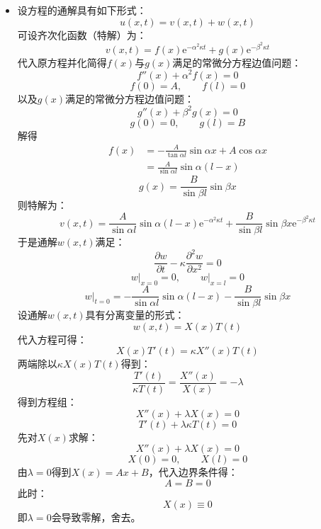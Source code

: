 \documentclass[fontset=windows]{ctexart}
\begin{document}
\begin{itemize}
    \item[10.]
    设方程的通解具有如下形式：
    \[
    u(x,t) = v(x,t) + w(x,t)
    \]
    可设齐次化函数（特解）为：
    \[
    v(x,t) = f(x)\mathrm{e}^{-\alpha^2\kappa t} + g(x)\mathrm{e}^{-\beta^2\kappa t}
    \]
    代入原方程并化简得$f(x)$与$g(x)$满足的常微分方程边值问题：
    \[
    f''(x) + \alpha^2f(x) = 0
    \]
    \[
    f(0) = A,\qquad
    f(l) = 0
    \]
    以及$g(x)$满足的常微分方程边值问题：
    \[
    g''(x) + \beta^2g(x) = 0
    \]
    \[
    g(0) = 0,\qquad
    g(l) = B
    \]
    解得
    \begin{align*}
    f(x)
    &= -\frac{A}{\tan\alpha l}\sin\alpha x + A\cos\alpha x \\
    &= \frac{A}{\sin\alpha l}\sin\alpha(l - x)
    \end{align*}
    \[
    g(x) = \frac{B}{\sin\beta l}\sin\beta x
    \]
    则特解为：
    \[
    v(x,t) = \frac{A}{\sin\alpha l}\sin\alpha(l - x)\mathrm{e}^{-\alpha^2\kappa t} + \frac{B}{\sin\beta l}\sin\beta x\mathrm{e}^{-\beta^2\kappa t}
    \]
    于是通解$w(x,t)$满足：
    \[
    \frac{\partial w}{\partial t} - \kappa\frac{\partial^2 w}{\partial x^2} = 0
    \]
    \[
    \left.w\right|_{x=0} = 0,\qquad
    \left.w\right|_{x=l} = 0
    \]
    \[
    \left.w\right|_{t=0} = -\frac{A}{\sin\alpha l}\sin\alpha(l - x) - \frac{B}{\sin\beta l}\sin\beta x
    \]
    设通解$w(x,t)$具有分离变量的形式：
    \[
    w(x,t) = X(x)T(t)
    \]
    代入方程可得：
    \[
    X(x)T'(t) = \kappa X''(x)T(t)
    \]
    两端除以$\kappa X(x)T(t)$得到：
    \[
    \frac{T'(t)}{\kappa T(t)} = \frac{X''(x)}{X(x)} = -\lambda
    \]
    得到方程组：
    \[
    X''(x) + \lambda X(x) = 0
    \]
    \[
    T'(t) + \lambda\kappa T(t) = 0
    \]
    先对$X(x)$求解：
    \[
    X''(x) + \lambda X(x) = 0
    \]
    \[
    X(0) = 0,\qquad
    X(l) = 0
    \]
    由$\lambda = 0$得到$X(x) = Ax + B$，代入边界条件得：
    \[
    A = B = 0
    \]
    此时：
    \[
    X(x) \equiv 0
    \]
    即$\lambda = 0$会导致零解，舍去。


\end{itemize}
\end{document}
